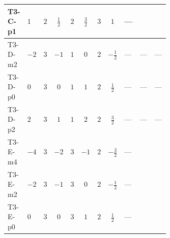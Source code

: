 \documentclass[8pt]{article}
\begin{document}
\begin{landscape}
\begin{longtable}{@{}llcccccc >{\raggedright\arraybackslash}p{0.21\linewidth} >{\raggedright\arraybackslash}p{0.21\linewidth} >{\raggedright\arraybackslash}p{0.21\linewidth}@{}}
\midrule
T3-C-p1 & $1$ & $2$ & $\frac{1}{2}$ & $2$ & $\frac{3}{2}$ & $3$ & $1$ & --- & \scriptsize\adjustbox{max width=\linewidth}{$\begin{gathered} -\frac{2}{3} \operatorname{Tr}\!\left({y_1}\,\left({y_1}\right)^{\dagger}\,{y_2}\,\left({y_2}\right)^{\dagger}\right)\end{gathered}$} & \scriptsize\adjustbox{max width=\linewidth}{$\begin{gathered} +\frac{4}{3} {\lambda_5} \left({\lambda_5}\right)^{*}\end{gathered}$} \\
\midrule
T3-D-m2 & $-2$ & $3$ & $-1$ & $1$ & $0$ & $2$ & $-\frac{1}{2}$ & --- & --- & --- \\
\midrule
T3-D-p0 & $0$ & $3$ & $0$ & $1$ & $1$ & $2$ & $\frac{1}{2}$ & --- & --- & --- \\
\midrule
T3-D-p2 & $2$ & $3$ & $1$ & $1$ & $2$ & $2$ & $\frac{3}{2}$ & --- & --- & --- \\
\midrule
T3-E-m4 & $-4$ & $3$ & $-2$ & $3$ & $-1$ & $2$ & $-\frac{3}{2}$ & --- & \scriptsize\adjustbox{max width=\linewidth}{$\begin{gathered} +\frac{2}{3} \operatorname{Tr}\!\left({y_1}\,\left({y_1}\right)^{\dagger}\,{y_2}\,\left({y_2}\right)^{\dagger}\right)\end{gathered}$} & \scriptsize\adjustbox{max width=\linewidth}{$\begin{gathered} -\frac{2}{9} {\lambda_5} \left({\lambda_5}\right)^{*}\end{gathered}$} \\
\midrule
T3-E-m2 & $-2$ & $3$ & $-1$ & $3$ & $0$ & $2$ & $-\frac{1}{2}$ & --- & \scriptsize\adjustbox{max width=\linewidth}{$\begin{gathered} +\frac{2}{3} \operatorname{Tr}\!\left({y_1}\,\left({y_1}\right)^{\dagger}\,{y_2}\,\left({y_2}\right)^{\dagger}\right)\end{gathered}$} & \scriptsize\adjustbox{max width=\linewidth}{$\begin{gathered} -\frac{2}{9} {\lambda_5} \left({\lambda_5}\right)^{*}\end{gathered}$} \\
\midrule
T3-E-p0 & $0$ & $3$ & $0$ & $3$ & $1$ & $2$ & $\frac{1}{2}$ & --- & \scriptsize\adjustbox{max width=\linewidth}{$\begin{gathered} +\frac{2}{3} \operatorname{Tr}\!\left({y_1}\,\left({y_1}\right)^{\dagger}\,{y_2}\,\left({y_2}\right)^{\dagger}\right)\end{gathered}$} & \scriptsize\adjustbox{max width=\linewidth}{$\begin{gathered} -\frac{2}{9} {\lambda_5} \left({\lambda_5}\right)^{*}\end{gathered}$} \\

\end{longtable}
\end{landscape}
\end{document}
